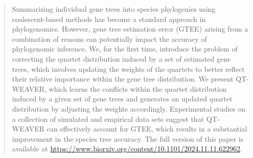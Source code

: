 \documentclass[runningheads]{llncs}
\begin{document}
\begin{abstract}
Summarizing individual gene trees into species phylogenies using coalescent-based methods has become a standard approach in phylogenomics. 
However, gene tree estimation error (GTEE) arising from a combination of reasons can potentially impact the accuracy of phylogenomic inference.
We, for the first time, introduce the problem of correcting the quartet distribution induced by a set of estimated gene trees, which involves updating the weights of the quartets to better reflect their relative importance within the gene tree distribution. We present QT-WEAVER, which learns the conflicts within the quartet distribution induced by a given set of gene trees and generates an updated quartet distribution by adjusting the weights accordingly. Experimental studies on a collection of simulated and empirical data sets suggest that QT-WEAVER can effectively account for GTEE, which results in a substantial improvement in the species tree accuracy. %
The full version of this paper is available at \url{https://www.biorxiv.org/content/10.1101/2024.11.11.622962}.







\end{abstract}
\end{document}

